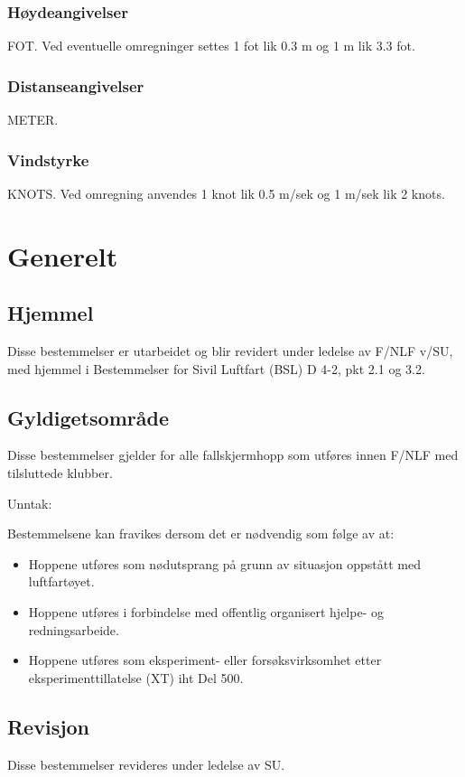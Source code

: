 \subsubsection{Høydeangivelser}
FOT. Ved eventuelle omregninger settes 1 fot lik 0.3 m og 1 m lik 3.3 fot.

\subsubsection{Distanseangivelser}
METER.

\subsubsection{Vindstyrke}
KNOTS. Ved omregning anvendes 1 knot lik 0.5 m/sek og 1 m/sek lik 2 knots.

\section{Generelt}
\subsection{Hjemmel}
Disse bestemmelser er utarbeidet og blir revidert under ledelse av F/NLF v/SU, med hjemmel i Bestemmelser for Sivil Luftfart (BSL) D 4-2, pkt 2.1 og 3.2.

\subsection{Gyldigetsområde}
Disse bestemmelser gjelder for alle fallskjermhopp som utføres innen F/NLF med tilsluttede klubber.

Unntak:

Bestemmelsene kan fravikes dersom det er nødvendig som følge av at:
\begin{itemize}
	\item Hoppene utføres som nødutsprang på grunn av situasjon oppstått med luftfartøyet.
	\item Hoppene utføres i forbindelse med offentlig organisert hjelpe- og redningsarbeide.
	\item Hoppene utføres som eksperiment- eller forsøksvirksomhet etter eksperimenttillatelse (XT) iht Del 500.
\end{itemize}

\subsection{Revisjon}
Disse bestemmelser revideres under ledelse av SU.

